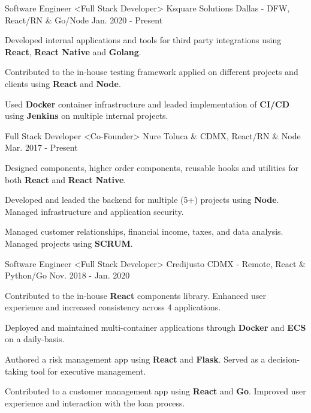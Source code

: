 \begin{cventries}
  \cventry
    {Software Engineer <Full Stack Developer>}
    {Ksquare Solutions}
    {Dallas - DFW, React/RN \& Go/Node}
    {Jan. 2020 - Present}
    {
      \begin{cvitems}
        \item {Developed internal applications and tools for third party integrations using \textbf{React}, \textbf{React Native} and \textbf{Golang}.}
        \item {Contributed to the in-house testing framework applied on different projects and clients using \textbf{React} and \textbf{Node}.}
        \item {Used \textbf{Docker} container infrastructure and leaded implementation of \textbf{CI/CD} using \textbf{Jenkins} on multiple internal projects.}
      \end{cvitems}
    }
  \cventry
    {Full Stack Developer <Co-Founder>}
    {Nure}
    {Toluca \& CDMX, React/RN \& Node}
    {Mar. 2017 - Present}
    {
      \begin{cvitems}
        \item {Designed components, higher order components, reusable hooks and utilities for both \textbf{React} and \textbf{React Native}.}
        \item {Developed and leaded the backend for multiple (5+) projects using \textbf{Node}. Managed infrastructure and application security.}
         \item {Managed customer relationships, financial income, taxes, and data analysis. Managed projects using \textbf{SCRUM}.}
      \end{cvitems}
    }
  \cventry
    {Software Engineer <Full Stack Developer>}
    {Credijusto}
    {CDMX - Remote, React \& Python/Go}
    {Nov. 2018 - Jan. 2020}
    {
      \begin{cvitems}
        \item {Contributed to the in-house \textbf{React} components library. Enhanced user experience and increased consistency across 4 applications.}
        \item {Deployed and maintained multi-container applications through \textbf{Docker} and \textbf{ECS} on a daily-basis.}
        \item {Authored a risk management app using \textbf{React} and \textbf{Flask}. Served as a decision-taking tool for executive management.}
        \item {Contributed to a customer management app using \textbf{React} and \textbf{Go}. Improved user experience and interaction with the loan process.}

\end{cvitems}}
\end{cventries}
